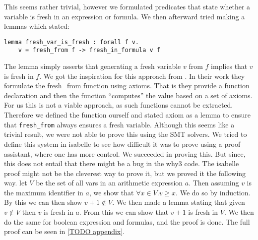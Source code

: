 This seems rather trivial, however we formulated predicates that state whether a variable is fresh in an expression or formula. We then afterward tried making a lemmas which stated:

\begin{lstlisting}
lemma fresh_var_is_fresh : forall f v.
    v = fresh_from f -> fresh_in_formula v f
\end{lstlisting}

The lemma simply asserts that generating a fresh variable $v$ from $f$ implies that $v$ is fresh in $f$.
We got the inspiration for this approach from \cite{TODO: WP revisited}.
In their work they formulate the fresh_from function using axioms.
That is they provide a function declaration and then the function ``computes'' the value based on a set of axioms.
For us this is not a viable approach, as such functions cannot be extracted. Therefore we defined the function ourself and stated axiom as a lemma to ensure that \texttt{fresh\_from} always ensures a fresh variable.
Although this seems like a trivial result, we were not able to prove this using the SMT solvers.
We tried to define this system in isabelle to see how difficult it was to prove using a proof assistant, where one has more control. We succeeded in proving this.
But since, this does not entail that there might be a bug in the why3 code.
The isabelle proof might not be the cleverest way to prove it, but we proved it the following way.
let $V$ be the set of all vars in an arithmetic expression $a$.
Then assuming $v$ is the maximum identifier in $a$, we show that $\forall x \in V. v \ge x$. We do so by induction.
By this we can then show $v + 1 \notin V$.
We then made a lemma stating that given $v \notin V$ then $v$ is fresh in $a$.
From this we can show that $v + 1$ is fresh in $V$.
We then do the same for boolean expression and formulas, and the proof is done.
The full proof can be seen in \autoref{TODO appendix}.